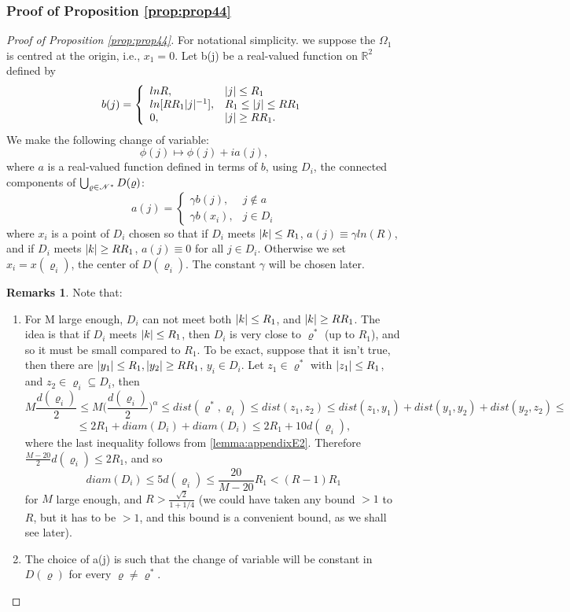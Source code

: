 \documentclass[11pt,reqno]{article}
\DeclarePairedDelimiter\abs{\lvert}{\rvert}%
\theoremstyle{definition}
\newtheorem*{remarks}{Remarks}
\newcommand{\twopartdef}[4]
{
	\left\{
		\begin{array}{ll}
			#1 & #2 \\
			#3 & #4
		\end{array}
	\right.
}
\newcommand{\threepartdef}[6]
{
	\left\{
		\begin{array}{lll}
			#1 & #2 \\
			#3 & #4 \\
			#5 & #6
		\end{array}
	\right.
}
\numberwithin{equation}{section}
\begin{document}
\subsubsection{Proof of Proposition \eqref{prop:prop44}}
\begin{proof}[Proof of Proposition \eqref{prop:prop44}]
For notational simplicity. we suppose the $\Omega_1$ is centred at the origin, i.e., $x_1=0$. Let b(j) be a real-valued function on $\mathbb{R}^2$ defined by
$$
b(j) = 
\threepartdef{lnR,} {\abs{j} \leq R_1}
{ln[RR_1\abs{j}^{-1}],}{R_1 \leq \abs{j} \leq RR_1}
{0,}{\abs{j} \geq RR_1.}
$$
We make the following change of variable:
\begin{equation} \label{label:eqVarChange}
\phi(j) \longmapsto \phi(j) + ia(j),
\end{equation}
where $a$ is a real-valued function defined in terms of $b$, using $D_i$, the connected components of $\bigcup_{\varrho \in \mathscr{N}^*}D(\varrho)$:
\begin{equation} \label{label:eq437}
a(j) = 
\twopartdef{\gamma b(j),} {j \notin a}
{\gamma b(x_i),}{j \in D_i}
\end{equation}
where $x_i$ is a point of $D_i$ chosen so that if $D_i$ meets $\abs{k} \leq R_1$, $a(j)\equiv \gamma ln(R)$, and if $D_i$ meets $\abs{k} \geq RR_1$, $a(j)\equiv 0$ for all $j \in D_i$. Otherwise we set $x_i=x(\varrho_i)$, the center of $D(\varrho_i)$. The constant $\gamma$ will be chosen later.

\begin{remarks}
Note that:
\begin{enumerate}
\item For M large enough, $D_i$ can not meet both $\abs{k} \leq R_1$, and $\abs{k} \geq RR_1$. The idea is that if $D_i$ meets $\abs{k} \leq R_1$, then $D_i$ is very close to $\varrho^*$ (up to $R_1$), and so it must be small compared to $R_1$. 
To be exact, suppose that it isn't true, then there are $\abs{y_1} \leq R_1, \abs{y_2} \geq RR_1$, $y_i \in D_i$. Let $z_1 \in \varrho^*$ with $\abs{z_1} \leq R_1$, and $z_2 \in \varrho_i \subseteq D_i$, then
$$
M\frac{d(\varrho_i)}{2} \leq M\Big( \frac{d(\varrho_i)}{2} \Big)^\alpha \leq dist(\varrho^*, \varrho_i) \leq dist(z_1, z_2) \leq dist(z_1, y_1) + dist(y_1, y_2) + dist(y_2, z_2) \leq 
$$
$$
\leq 2R_1 + diam(D_i) + diam(D_i) \leq 2R_1 + 10 d(\varrho_i),
$$
where the last inequality follows from \eqref{lemma:appendixE2}. Therefore $\frac{M-20}{2}d(\varrho_i) \leq 2R_1$, and so
$$
diam(D_i) \leq 5d(\varrho_i) \leq \frac{20}{M-20} R_1 < (R-1)R_1
$$
for $M$ large enough, and $R>\frac{\sqrt{2}}{1+1/4}$ (we could have taken any bound $> 1$ to $R$, but it has to be $> 1$, and this bound is a convenient bound, as we shall see later).
\item The choice of a(j) is such that the change of variable will be constant in $D(\varrho)$ for every $\varrho \neq \varrho^*$.\\
\end{enumerate}
\end{remarks}


\end{proof}
\end{document}
